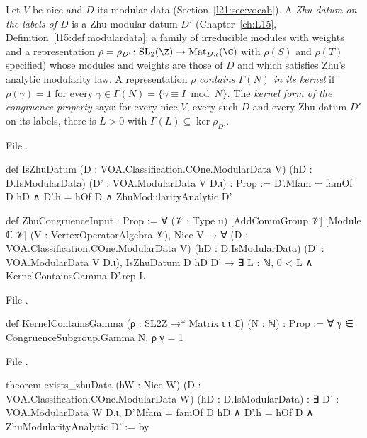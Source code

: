 \begin{definition}\label{l21:def:zhucong}
Let $V$ be nice and $D$ its modular data (Section~\ref{l21:sec:vocab}). A \emph{Zhu datum on the labels of $D$} is a Zhu modular
datum $D'$ (Chapter~\ref{ch:L15}, Definition~\ref{l15:def:modulardata}: a family of irreducible modules with weights and a
representation $\rho=\rho_{D'}\colon\ltwooneSL(\Z)\to\mathrm{Mat}_{D.\iota}(\C)$ with $\rho(S)$ and $\rho(T)$ specified) whose
modules and weights are those of $D$ and which satisfies Zhu's analytic modularity law. A representation $\rho$
\emph{contains $\Gamma(N)$ in its kernel} if $\rho(\gamma)=1$ for every $\gamma\in\Gamma(N)=\{\gamma\equiv I\bmod N\}$. The
\emph{kernel form of the congruence property} says: for every nice $V$, every such $D$ and every Zhu datum $D'$ on its labels,
there is $L>0$ with $\Gamma(L)\subseteq\ker\rho_{D'}$.
\end{definition}
\noindent File .
\begin{leancode}
def IsZhuDatum (D : VOA.Classification.COne.ModularData V) (hD : D.IsModularData)
    (D' : VOA.ModularData V D.ι) : Prop :=
  D'.Mfam = famOf D hD ∧ D'.h = hOf D ∧ ZhuModularityAnalytic D'

def ZhuCongruenceInput : Prop :=
  ∀ (𝒱 : Type u) [AddCommGroup 𝒱] [Module ℂ 𝒱] (V : VertexOperatorAlgebra 𝒱), Nice V →
    ∀ (D : VOA.Classification.COne.ModularData V) (hD : D.IsModularData)
      (D' : VOA.ModularData V D.ι), IsZhuDatum D hD D' →
      ∃ L : ℕ, 0 < L ∧ KernelContainsGamma D'.rep L
\end{leancode}
\noindent File .
\begin{leancode}
def KernelContainsGamma (ρ : SL2Z →* Matrix ι ι ℂ) (N : ℕ) : Prop :=
  ∀ γ ∈ CongruenceSubgroup.Gamma N, ρ γ = 1
\end{leancode}
\noindent File .
\begin{leancode}
theorem exists_zhuData (hW : Nice W) (D : VOA.Classification.COne.ModularData W)
    (hD : D.IsModularData) :
    ∃ D' : VOA.ModularData W D.ι, D'.Mfam = famOf D hD ∧ D'.h = hOf D ∧
      ZhuModularityAnalytic D' := by
\end{leancode}

